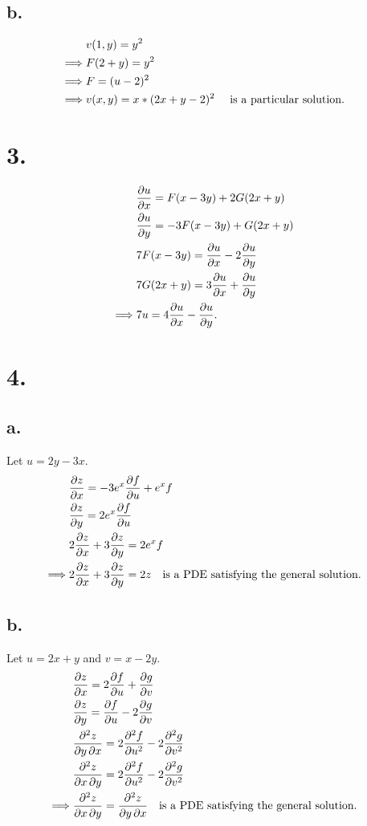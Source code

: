 \documentclass{article}
\begin{document}
\subsection*{b.}
\begin{align*}
  &v(1, y) = y^2 &&\\
  \implies& F(2+y)  = y^2 &&\\
  \implies& F  = (u-2)^2 &&\\
  \implies& v(x, y)  = x*(2x+y - 2)^2 \text{ \quad is a particular solution.} &&\\
\end{align*}

\section*{3.}
\begin{align*}
  &\pdv{u}{x} = F(x-3y) + 2G(2x+y) &&\\
  &\pdv{u}{y} = -3F(x-3y) + G(2x+y) &&\\
  &7F(x-3y) = \pdv{u}{x} - 2\pdv{u}{y} &&\\
  &7G(2x + y) = 3\pdv{u}{x} + \pdv{u}{y} &&\\
  \implies &7u = 4\pdv{u}{x} - \pdv{u}{y}.
\end{align*}

\section*{4.}
\subsection*{a.}

Let $u = 2y-3x$.
\begin{align*}
  &\pdv{z}{x} = -3e^x \pdv{f}{u} + e^xf &&\\
  &\pdv{z}{y} = 2e^x \pdv{f}{u} &&\\
  &2\pdv{z}{x} + 3\pdv{z}{y} = 2e^x f &&\\
  \implies& 2\pdv{z}{x} + 3\pdv{z}{y} = 2z \text{\quad is a PDE satisfying the general solution.}
\end{align*}

\subsection*{b.}

Let $u = 2x+y$ and $v = x-2y$.
\begin{align*}
  &\pdv{z}{x} = 2 \pdv{f}{u} + \pdv{g}{v} &&\\
  &\pdv{z}{y} = \pdv{f}{u} - 2\pdv{g}{v} &&\\
  &\pdv{z}{y,x} = 2 \pdv[order=2]{f}{u} - 2\pdv[order=2]{g}{v} &&\\
  &\pdv{z}{x,y} = 2\pdv[order=2]{f}{u} - 2\pdv[order=2]{g}{v} &&\\
  \implies& \pdv{z}{x,y} = \pdv{z}{y,x} \text{\quad is a PDE satisfying the general solution.}
\end{align*}
\end{document}
